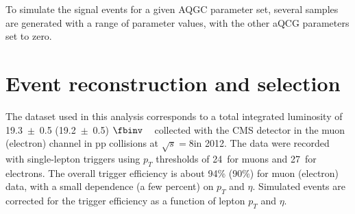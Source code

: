 \begin{table}[htb]
\centering
  \caption{Cross sections used to normalize the simulated samples. All cross sections assume a photon $E_T$ $>$ 10~GeV, $|\eta^{\gamma}|<2.5$.  
The order of the cross section calculation is also indicated. The normalization for the W$\gamma$+Jets sample is derived from data. The contribution from the 
jet$\rightarrow\gamma$ process is also obtained from data as described in Section~\ref{sec:BackgroundModeling}. }
  \label{tab:samples}
\end{table}

To simulate the signal events for a given AQGC parameter set, several samples are generated with a range of parameter values, 
with the other aQCG parameters set to zero.

\section{Event reconstruction and selection}
\label{sec:recosel}

The dataset used in this analysis corresponds to a total integrated
luminosity of 19.3~$\pm$~0.5 (19.2~$\pm$~0.5) $\fbinv$ ~\cite{lumiPAS} collected with
the CMS detector in the muon (electron) channel in pp collisions at
$\sqrt{s}=8$\TeV in 2012.  The data were recorded with single-lepton
triggers using $p_T$ thresholds of 24~\GeV for muons and 27~\GeV for
electrons. The overall trigger efficiency is about 94\% (90\%) for
muon (electron) data, with a small dependence (a few percent) on $p_T$
and $\eta$. Simulated events are corrected for the trigger efficiency
as a function of lepton $p_T$ and $\eta$.


